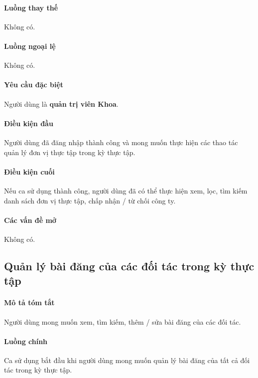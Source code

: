 \documentclass[./../main.tex]{subfiles}
\begin{document}
\paragraph*{Luồng thay thế} Không có.

\paragraph*{Luồng ngoại lệ} Không có.

\paragraph*{Yêu cầu đặc biệt}

Người dùng là \textbf{quản trị viên Khoa}.

\paragraph*{Điều kiện đầu}

Người dùng đã đăng nhập thành công và mong muốn thực hiện các thao tác quản lý đơn vị thực tập trong kỳ thực tập.

\paragraph*{Điều kiện cuối}

Nếu ca sử dụng thành công, người dùng đã có thể thực hiện xem, lọc, tìm kiếm danh sách đơn vị thực tập, chấp nhận / từ chối công ty.

\paragraph*{Các vấn đề mở}

Không có.

\subsection{Quản lý bài đăng của các đối tác trong kỳ thực tập}

\paragraph*{Mô tả tóm tắt}

Người dùng mong muốn xem, tìm kiếm, thêm / sửa bài đăng của các đối tác.

\paragraph*{Luồng chính} Ca sử dụng bắt đầu khi người dùng mong muốn quản lý bài đăng của tất cả đối tác trong kỳ thực tập.
\end{document}
